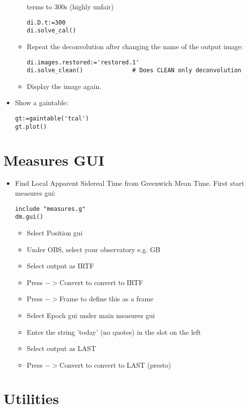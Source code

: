 \begin{itemize}
\begin{itemize}
terms to 300s (highly unfair)
\begin{verbatim}
di.D.t:=300
di.solve_cal()
\end{verbatim}
\item Repeat the deconvolution after changing the name of the output
image: 
\begin{verbatim}
di.images.restored:='restored.1'
di.solve_clean()              # Does CLEAN only deconvolution
\end{verbatim}
\item Display the image again.
\end{itemize}
\item Show a gaintable:
\begin{verbatim}
gt:=gaintable('tcal')
gt.plot()
\end{verbatim}
\end{itemize}

\section{Measures GUI}

\begin{itemize}
\item Find Local Apparent Sidereal Time from Greenwich Mean Time. First start 
measures gui:
\begin{verbatim}
include "measures.g"
dm.gui()
\end{verbatim}
\begin{itemize}
\item Select Position gui
\item Under OBS, select your observatory e.g. GB
\item Select output as IRTF
\item Press $->$Convert to convert to IRTF
\item Press $->$Frame to define this as a frame
\item Select Epoch gui under main measures gui
\item Enter the string 'today' (no quotes) in the slot on
the left
\item Select output as LAST
\item Press $->$Convert to convert to LAST (presto)
\end{itemize}
\end{itemize}

\section{Utilities}

